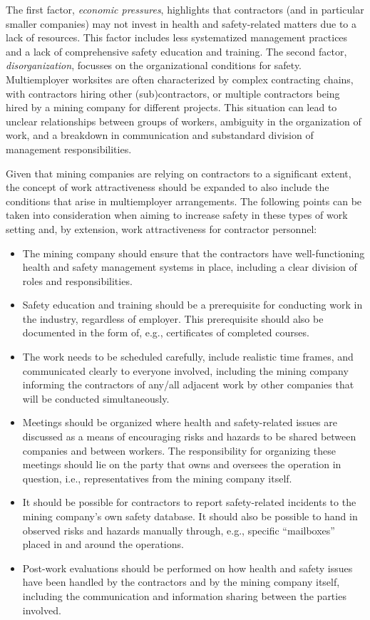 \documentclass[
  12pt,
]{scrbook}
\begin{document}
The first factor, \emph{economic pressures}, highlights that contractors (and in particular smaller companies) may not invest in health and safety-related matters due to a lack of resources. This factor includes less systematized management practices and a lack of comprehensive safety education and training. The second factor, \emph{disorganization}, focusses on the organizational conditions for safety. Multiemployer worksites are often characterized by complex contracting chains, with contractors hiring other (sub)contractors, or multiple contractors being hired by a mining company for different projects. This situation can lead to unclear relationships between groups of workers, ambiguity in the organization of work, and a breakdown in communication and substandard division of management responsibilities.

Given that mining companies are relying on contractors to a significant extent, the concept of work attractiveness should be expanded to also include the conditions that arise in multiemployer arrangements. The following points can be taken into consideration when aiming to increase safety in these types of work setting and, by extension, work attractiveness for contractor personnel:

\begin{itemize}
\item
  The mining company should ensure that the contractors have well-functioning health and safety management systems in place, including a clear division of roles and responsibilities.
\item
  Safety education and training should be a prerequisite for conducting work in the industry, regardless of employer. This prerequisite should also be documented in the form of, e.g., certificates of completed courses.
\item
  The work needs to be scheduled carefully, include realistic time frames, and communicated clearly to everyone involved, including the mining company informing the contractors of any/all adjacent work by other companies that will be conducted simultaneously.
\item
  Meetings should be organized where health and safety-related issues are discussed as a means of encouraging risks and hazards to be shared between companies and between workers. The responsibility for organizing these meetings should lie on the party that owns and oversees the operation in question, i.e., representatives from the mining company itself.
\item
  It should be possible for contractors to report safety-related incidents to the mining company's own safety database. It should also be possible to hand in observed risks and hazards manually through, e.g., specific ``mailboxes'' placed in and around the operations.
\item
  Post-work evaluations should be performed on how health and safety issues have been handled by the contractors and by the mining company itself, including the communication and information sharing between the parties involved.
\end{itemize}
\end{document}
